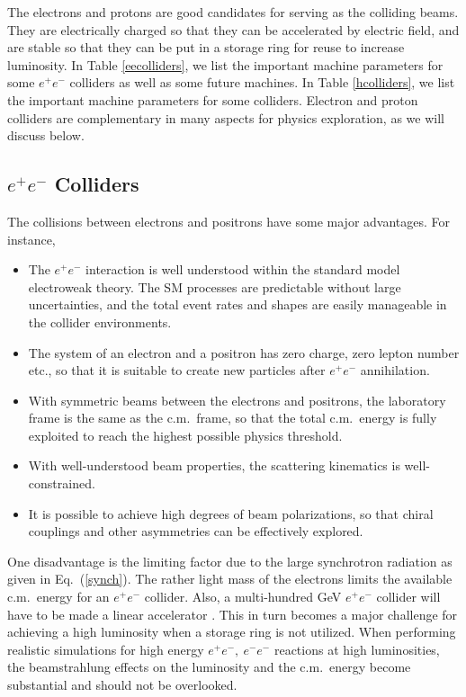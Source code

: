 \documentclass[prd,aps,floats,preprintnumbers,preprint,superscriptaddress,floatfix,nofootinbib]{revtex4}
\def\epem{e^+e^-}
\begin{document}
The  electrons and protons are good candidates for serving
as the colliding beams. They are electrically charged so that they can be
accelerated by electric field, and are stable so that they can be put in a 
storage ring for reuse to increase luminosity. 
In Table \ref{eecolliders}, we list the important machine parameters for some
$\epem $ colliders as well as some future machines. 
In Table \ref{hcolliders}, we list the important machine parameters for some
colliders. Electron and proton colliders are complementary 
in many aspects for physics exploration, as we will discuss below. 
%

\subsection{$e^+e^-$ Colliders}

The collisions between electrons and  positrons  have some major  advantages. 
For instance,
%
\begin{itemize}
\item The $\epem$ interaction is well understood within the standard model
electroweak theory. The SM processes are predictable without large
uncertainties, and  the total event rates and shapes are easily manageable 
in the collider environments. 
\item The system of an electron and a  positron  has zero charge, zero lepton
number etc., so that it is suitable to create new particles after $\epem$
annihilation.
\item With symmetric beams between the electrons and positrons,  
the laboratory frame is the same as the c.m.~frame, 
so that the total c.m.~energy is fully exploited to reach the highest possible physics
threshold.
\item With well-understood beam properties, the scattering kinematics is 
well-constrained. 
\item It is possible to achieve high degrees of beam polarizations, so that chiral
couplings and other asymmetries can be effectively explored.
\end{itemize}

One disadvantage is the limiting factor due to the large synchrotron radiation
as given in Eq.~(\ref{synch}). The rather light mass of the electrons limits the
available c.m.~energy for an $\epem$ collider. Also, 
 a multi-hundred GeV $\epem$ collider will have to be made a linear 
accelerator \cite{ILC}. This in turn becomes a major 
challenge for achieving a high
luminosity when a storage ring is not utilized.
When performing realistic simulations for high energy $\epem,\ e^-e^-$
reactions at high luminosities, the beamstrahlung effects on the
luminosity and the c.m.~energy  become
substantial and should not be overlooked. 
\end{document}
